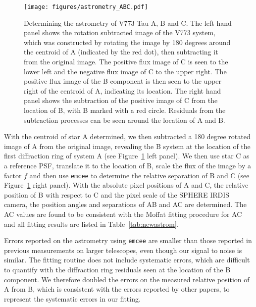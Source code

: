 \documentclass{aa}
\begin{document}
\begin{figure}
\begin{center}
    \centering
    \texttt{[image: figures/astrometry\_ABC.pdf]}
    \caption{Determining the astrometry of V773 Tau A, B and C.
    The left hand panel shows the rotation subtracted image of the V773 system, which was constructed by rotating the image by 180 degrees around the centroid of A (indicated by the red dot), then subtracting it from the original image.
    The positive flux image of C is seen to the lower left and the negative flux image of C to the upper right.
    The positive flux image of the B component is then seen to the upper right of the centroid of A, indicating its location.
    The right hand panel shows the subtraction of the positive image of C from the location of B, with B marked with a red circle.
    Residuals from the subtraction processes can be seen around the location of A and B.}
  \label{fig:rotsub}
\end{center}
\end{figure}

With the centroid of star A determined, we then subtracted a 180 degree rotated image of A from the original image, revealing the B system at the location of the first diffraction ring of system A (see Figure~\ref{fig:rotsub} left panel).
%
We then use star C as a reference PSF, translate it to the location of B, scale the flux of the image by a factor $f$ and then use {\tt emcee} to determine the relative separation of B and C (see Figure~\ref{fig:rotsub} right panel).
%
With the absolute pixel positions of A and C, the relative position of B with respect to C and the pixel scale of the SPHERE IRDIS camera, the position angles and separations of AB and AC are determined. 
%
The AC values are found to be consistent with the Moffat fitting procedure for AC and all fitting results are listed in Table~\ref{tab:newastrom}.

Errors reported on the astrometry using {\tt emcee} are smaller than those reported in previous measurements on larger telescopes, even though our signal to noise is similar.
%
The fitting routine does not include systematic errors, which are difficult to quantify with the diffraction ring residuals seen at the location of the B component.
%
We therefore doubled the errors on the measured relative position of A from B, which is consistent with the errors reported by other papers, to represent the systematic errors in our fitting.
\end{document}
